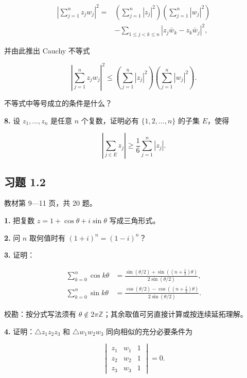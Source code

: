 \documentclass[11pt,a4paper]{article}
\begin{document}
\[
\begin{aligned}
\left|\sum_{j=1}^n z_jw_j\right|^2
={}&\left(\sum_{j=1}^n|z_j|^2\right)\left(\sum_{j=1}^n|w_j|^2\right)\\
&-\sum_{1\le j<k\le n}|z_j\bar w_k-z_k\bar w_j|^2,
\end{aligned}
\]

并由此推出 Cauchy 不等式

\[
\left|\sum_{j=1}^n z_jw_j\right|^2
\le\left(\sum_{j=1}^n|z_j|^2\right)\left(\sum_{j=1}^n|w_j|^2\right).
\]

不等式中等号成立的条件是什么？

\par{}
\noindent\textbf{8.} 设 \(z_1,\ldots,z_n\) 是任意 \(n\) 个复数，证明必有
\(\{1,2,\ldots,n\}\) 的子集 \(E\)，使得

\[
\left|\sum_{j\in E}z_j\right|\ge\frac16\sum_{j=1}^n|z_j|.
\]

\subsection{习题 1.2}\label{ux4e60ux9898-1.2}

教材第 9---11 页，共 20 题。

\par{}
\noindent\textbf{1.} 把复数 \(z=1+\cos\theta+i\sin\theta\) 写成三角形式。

\par{}
\noindent\textbf{2.} 问 \(n\) 取何值时有 \((1+i)^n=(1-i)^n\)？

\par{}
\noindent\textbf{3.} 证明：

\[
\begin{aligned}
\sum_{k=0}^n\cos k\theta
&=\frac{\sin(\theta/2)+\sin((n+\tfrac12)\theta)}{2\sin(\theta/2)},\\
\sum_{k=0}^n\sin k\theta
&=\frac{\cos(\theta/2)-\cos((n+\tfrac12)\theta)}{2\sin(\theta/2)}.
\end{aligned}
\]

校勘：按分式写法须有
\(\theta\notin2\pi\mathbb Z\)；其余取值可另直接计算或按连续延拓理解。

\par{}
\noindent\textbf{4.} 证明：\(\triangle z_1z_2z_3\) 和 \(\triangle w_1w_2w_3\)
同向相似的充分必要条件为

\[
\begin{vmatrix}z_1&w_1&1\\z_2&w_2&1\\z_3&w_3&1\end{vmatrix}=0.
\]
\end{document}
